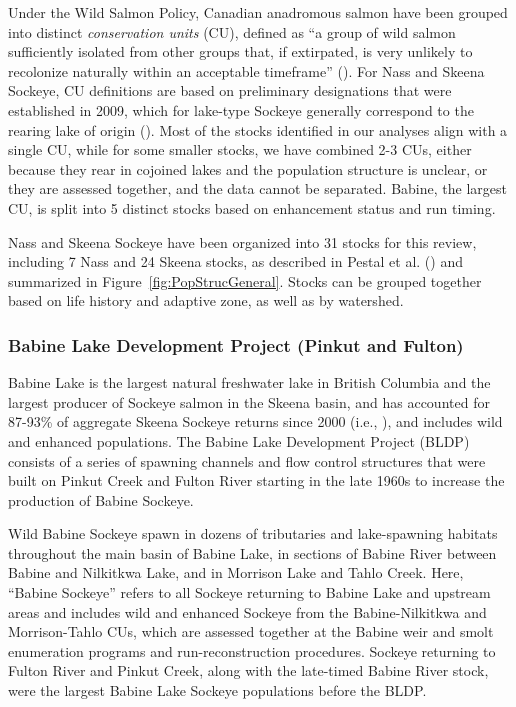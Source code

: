 \documentclass[french,11pt]{book}
\begin{document}
Under the Wild Salmon Policy, Canadian anadromous salmon have been grouped into distinct \emph{conservation units} (CU), defined as ``a group of wild salmon sufficiently isolated from other groups that, if extirpated, is very unlikely to recolonize naturally within an acceptable timeframe'' (). For Nass and Skeena Sockeye, CU definitions are based on preliminary designations that were established in 2009, which for lake-type Sockeye generally correspond to the rearing lake of origin (). Most of the stocks identified in our analyses align with a single CU, while for some smaller stocks, we have combined 2-3 CUs, either because they rear in cojoined lakes and the population structure is unclear, or they are assessed together, and the data cannot be separated. Babine, the largest CU, is split into 5 distinct stocks based on enhancement status and run timing.

Nass and Skeena Sockeye have been organized into 31 stocks for this review, including 7 Nass and 24 Skeena stocks, as described in Pestal et al. () and summarized in Figure~\ref{fig:PopStrucGeneral}. Stocks can be grouped together based on life history and adaptive zone, as well as by watershed.

\subsubsection{Babine Lake Development Project (Pinkut and Fulton)}\label{babine-lake-development-project-pinkut-and-fulton}

Babine Lake is the largest natural freshwater lake in British Columbia and the largest producer of Sockeye salmon in the Skeena basin, and has accounted for 87-93\% of aggregate Skeena Sockeye returns since 2000 (i.e., ), and includes wild and enhanced populations. The Babine Lake Development Project (BLDP) consists of a series of spawning channels and flow control structures that were built on Pinkut Creek and Fulton River starting in the late 1960s to increase the production of Babine Sockeye.

Wild Babine Sockeye spawn in dozens of tributaries and lake-spawning habitats throughout the main basin of Babine Lake, in sections of Babine River between Babine and Nilkitkwa Lake, and in Morrison Lake and Tahlo Creek. Here, ``Babine Sockeye'' refers to all Sockeye returning to Babine Lake and upstream areas and includes wild and enhanced Sockeye from the Babine-Nilkitkwa and Morrison-Tahlo CUs, which are assessed together at the Babine weir and smolt enumeration programs and run-reconstruction procedures. Sockeye returning to Fulton River and Pinkut Creek, along with the late-timed Babine River stock, were the largest Babine Lake Sockeye populations before the BLDP.
\end{document}
